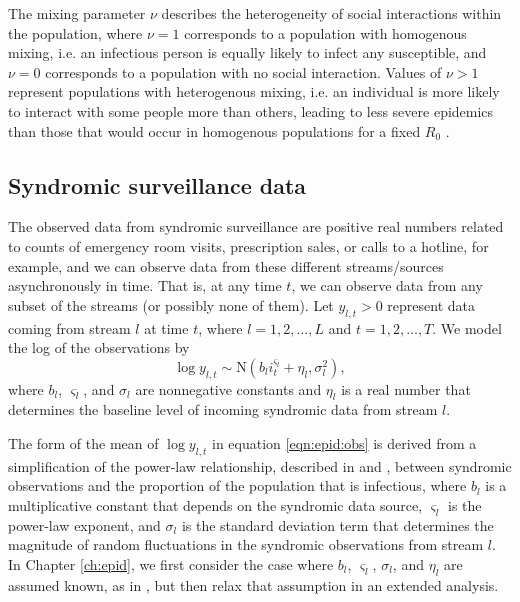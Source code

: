 The mixing parameter $\nu$ describes the heterogeneity of social interactions within the population, where $\nu = 1$ corresponds to a population with homogenous mixing, i.e. an infectious person is equally likely to infect any susceptible, and $\nu = 0$ corresponds to a population with no social interaction. Values of $\nu > 1$ represent populations with heterogenous mixing, i.e. an individual is more likely to interact with some people more than others, leading to less severe epidemics than those that would occur in homogenous populations for a fixed $R_0$ \citep{stroud2006powerlaw, novozhilov2008hetero}.

\subsection{Syndromic surveillance data \label{sec:epid:obs}}

The observed data from syndromic surveillance are positive real numbers related to counts of emergency room visits, prescription sales, or calls to a hotline, for example, and we can observe data from these different streams/sources asynchronously in time. That is, at any time $t$, we can observe data from any subset of the streams (or possibly none of them). Let $y_{l,t}>0$ represent data coming from stream $l$ at time $t$, where $l = 1,2,\ldots,L$ and $t = 1,2,\ldots,T$. We model the log of the observations by
\begin{equation}
\log y_{l,t} \sim \mbox{N}\left(b_li_t^{\varsigma_l} + \eta_l,\sigma_l^2\right), \label{eqn:epid:obs}
\end{equation}
where $b_l$, $\varsigma_l$, and $\sigma_l$ are nonnegative constants \citep{skvortsov2012monitoring} and $\eta_l$ is a real number that determines the baseline level of incoming syndromic data from stream $l$.

The form of the mean of $\log y_{l,t}$ in equation \eqref{eqn:epid:obs} is derived from a simplification of the power-law relationship, described in \citet{skvortsov2012monitoring} and \citet{Gins:Mohe:Pate:Bram:Smol:Bril:dete:2009}, between syndromic observations and the proportion of the population that is infectious, where $b_l$ is a multiplicative constant that depends on the syndromic data source, $\varsigma_l$ is the power-law exponent, and $\sigma_l$ is the standard deviation term that determines the magnitude of random fluctuations in the syndromic observations from stream $l$. In Chapter \ref{ch:epid}, we first consider the case where $b_l$, $\varsigma_l$, $\sigma_l$, and $\eta_l$ are assumed known, as in \citep{skvortsov2012monitoring}, but then relax that assumption in an extended analysis.

